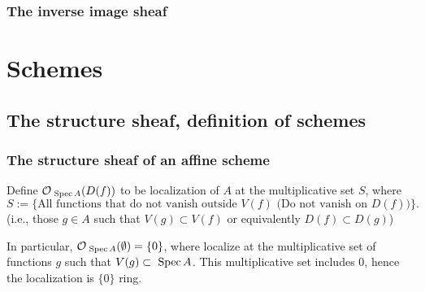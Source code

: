 \documentclass[11pt]{book} %
\begin{document}
\section{The inverse image sheaf}















\part{Schemes}




\chapter{The structure sheaf, definition of schemes}
\section{The structure sheaf of an affine scheme
}
\begin{definition}
Define ${\cal O}_{\text{ Spec\,} A}(D(f))$ to be localization of $A$ at the multiplicative set $S$, where
$$
S:=\{\text{All functions that do not vanish outside $V(f)$ (Do not vanish on $D(f))$}\}.
$$
(i.e., those $g\in A$ such that $V(g)\subset V(f)$ or equivalently $D(f)\subset D(g)$)
\end{definition}
In particular, ${\cal O}_{\text{ Spec\,} A}(\emptyset)=\{0\}$, where localize at the multiplicative set of functions $g$ such that $V(g)\subset \text{ Spec\,} A$. This multiplicative set includes $0$, hence the localization is $\{0\}$ ring.
\end{document}
